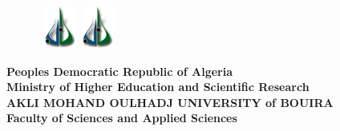 \begin{titlepage}

\begin{figure}[htbp]
 \hbox{
     \includegraphics[width=40px]{logo.png}
     \hspace*{12.5cm}
     \includegraphics[width=40px]{logo.png}
  }
\end{figure}

\vspace {-1.5cm}

\begin{center}
{\bf Peoples Democratic Republic of Algeria\\
Ministry of Higher Education and Scientific Research} \vspace{0.1cm}\\

{\bf {\large AKLI MOHAND OULHADJ UNIVERSITY of BOUIRA}}\\

{\bf Faculty of Sciences and Applied Sciences} \\


\end{center}
\end{titlepage}
